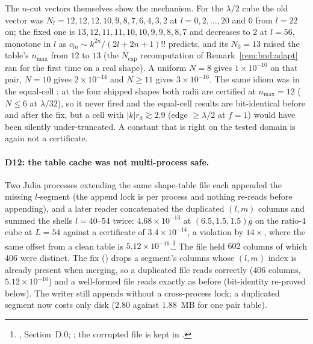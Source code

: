 \noindent
The $n$-cut vectors themselves show the mechanism. For the $\lambda/2$ cube the old vector
was $N_l = 12,12,12,10,9,8,7,6,4,3,2$ at $l = 0,2,\dots,20$ and $0$ from $l = 22$ on; the
fixed one is $13,12,11,11,10,10,9,9,8,8,7$ and decreases to $2$ at $l = 56$, monotone in
$l$ as $c_{ln}\sim k^{2n}/(2l+2n+1)!!$ predicts, and its $N_0 = 13$ raised the table's
$n_{\max}$ from $12$ to $13$ (the $N_{\mathrm{cap}}$ recomputation of Remark~\ref{rem:bnd:adapt}
ran for the first time on a real shape). A uniform $N = 8$ gives $1\times10^{-10}$ on that
pair, $N = 10$ gives $2\times10^{-14}$ and $N\ge11$ gives $3\times10^{-16}$. The same
 idiom was in the equal-cell ; at the four shipped shapes both
radii are certified at $n_{\max} = 12$ ($N\le6$ at $\lambda/32$), so it never fired and the
equal-cell results are bit-identical before and after the fix, but a cell with
$|k|r_{\mathrm{d}}\gtrsim2.9$ (edge $\ge\lambda/2$ at $f = 1$) would have been silently
under-truncated. A constant that is right on the tested domain is again not a certificate.

\paragraph{D12: the table cache was not multi-process safe.} Two Julia processes
extending the same shape-table file each appended the missing $l$-segment (the append lock
is per process and nothing re-reads before appending), and a later reader concatenated the
duplicated $(l,m)$ columns and summed the shells $l = 40$--$54$ twice: $4.68\times10^{-13}$
at $(6.5,1.5,1.5)g$ on the ratio-$4$ cube at $L = 54$ against a certificate of
$3.4\times10^{-14}$, a violation by $14\times$, where the same offset from a clean table
is $5.12\times10^{-16}$.\footnote{, Section~D.0;
; the corrupted file is kept in
.} The file held $602$ columns of which $406$ were
distinct. The fix () drops a segment's columns whose $(l,m)$ index is already
present when merging, so a duplicated file reads correctly ($406$ columns,
$5.12\times10^{-16}$) and a well-formed file reads exactly as before (bit-identity
re-proved below). The writer still appends without a cross-process lock; a duplicated
segment now costs only disk ($2.80$ against $1.88$~MB for one pair table).

